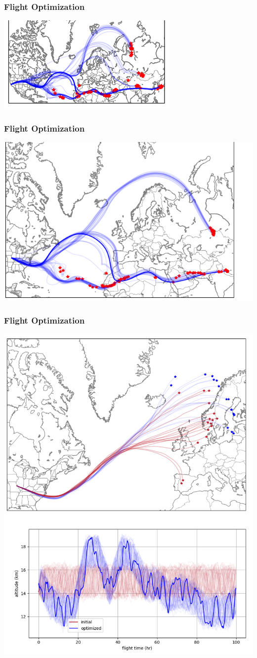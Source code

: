 \documentclass[10pt,mathserif]{beamer}
\begin{document}
\begin{frame}
\frametitle{Flight Optimization}
\begin{center}
\includegraphics[width=1\linewidth,trim={0 0cm 0 0cm},clip]{f1.png}
\end{center}
\end{frame}
\begin{frame}
\frametitle{Flight Optimization}
\begin{center}
\includegraphics[width=1\linewidth,trim={0 0cm 0 0cm},clip]{f2.png}
\end{center}
\end{frame}
\begin{frame}
\frametitle{Flight Optimization}
\begin{center}
\includegraphics[width=.6\linewidth,trim={0 0cm 0 0cm},clip]{f3.png}
\end{center}
\end{frame}
\end{document}
